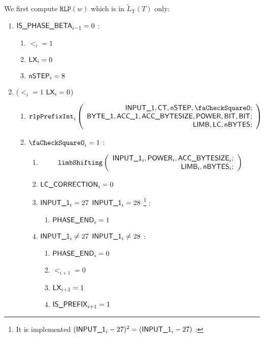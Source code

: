 \begin{center}
\end{center}

We first compute $\mathtt{RLP}(w)$ which is in $\widetilde{L}_{\mathrm{T}}(T)$ only:
\begin{enumerate}
    \item \If $\textsf{IS\_PHASE\_BETA}_{i-1}=0$ \Then:
	\begin{enumerate}
	    \item $\lt_{i}=1$
	    \item $\textsf{LX}_{i}=0$
	    \item $\textsf{nSTEP}_{i}=8$
	\end{enumerate} 
    \item \If ($\lt_{i}=1$ \et $\textsf{LX}_{i}=0$)
	\begin{enumerate}
	    \item
		\[
		    \rlpPrefixInt_{i}
		    \left( \begin{array}{r}
			\Input{1},
			\ct,
			\nbstep,
			\done; \\
			\byteCol{1},
			\acc{1},
			\accsize,
			\Power,
			\genBit,
			\genBit; \\
			\limb,
			\lc,
			\limbsize; \\
		    \end{array} \right)
		\]
	    \item \If $\done_{i}=1$ \Then:
		\begin{enumerate}
		    \item 
			\[
			    \texttt{limbShifting}
			    \left( \begin{array}{r}
				\textsf{INPUT\_1}_{i},
				\textsf{POWER}_{i},
				\textsf{ACC\_BYTESIZE}_{i}; \\
				\textsf{LIMB}_{i},
				\textsf{nBYTES}_{i}; \\
			    \end{array} \right)
			\]
		    \item $\textsf{LC\_CORRECTION}_{i}=0$
		    \item $\textsf{INPUT\_1}_{i} = 27$ \Or $\textsf{INPUT\_1}_{i} = 28$ \footnote{It is implemented \If $(\textsf{INPUT\_1} _{i} -27)^{2} = (\textsf{INPUT\_1} _{i} -27)$ \Then:} \Then:
			\begin{enumerate}
			    \item $\textsf{PHASE\_END}_{i}=1$ 
			\end{enumerate}
		    \item $\textsf{INPUT\_1}_{i} \neq 27$ \et $\textsf{INPUT\_1}_{i} \neq 28$ \Then:
			\begin{enumerate}
			    \item $\textsf{PHASE\_END}_{i}=0$
			    \item $\lt_{i+1}=0$
			    \item $\textsf{LX}_{i+1}=1$
			    \item $\textsf{IS\_PREFIX}_{i+1}=1$
			\end{enumerate}
		\end{enumerate}
	\end{enumerate}
\end{enumerate}
